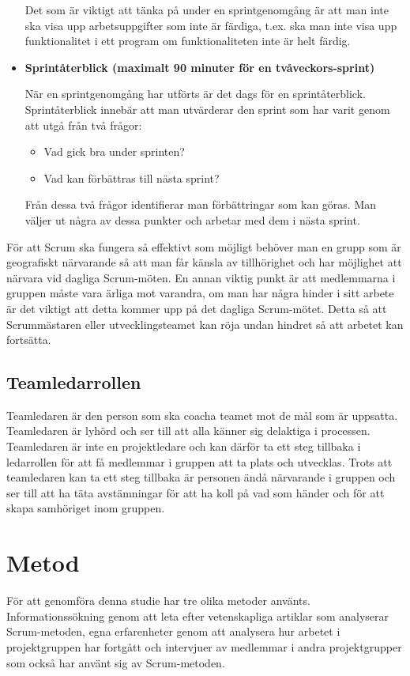 \begin{itemize}
Det som är viktigt att tänka på under en sprintgenomgång är att man inte ska visa upp arbetsuppgifter som inte är färdiga, t.ex. ska man inte visa upp funktionalitet i ett program om funktionaliteten inte är helt färdig.

\item \textbf{Sprintåterblick (maximalt 90 minuter för en tvåveckors-sprint)}

När en sprintgenomgång har utförts är det dags för en sprintåterblick. Sprintåterblick innebär att man utvärderar den sprint som har varit genom att utgå från två frågor:

\begin{itemize}
	\item Vad gick bra under sprinten?
	\item Vad kan förbättras till nästa sprint?
\end{itemize}

Från dessa två frågor identifierar man förbättringar som kan göras. Man väljer ut några av dessa punkter och arbetar med dem i nästa sprint.

\end{itemize}

För att Scrum ska fungera så effektivt som möjligt behöver man en grupp som är geografiskt närvarande så att man får känsla av tillhörighet och har möjlighet att närvara vid dagliga Scrum-möten. En annan viktig punkt är att medlemmarna i gruppen måste vara ärliga mot varandra, om man har några hinder i sitt arbete är det viktigt att detta kommer upp på det dagliga Scrum-mötet. Detta så att Scrummästaren eller utvecklingsteamet kan röja undan hindret så att arbetet kan fortsätta.\cite{scrum}

\subsection{Teamledarrollen}
Teamledaren är den person som ska coacha teamet mot de mål som är uppsatta. Teamledaren är lyhörd och ser till att alla känner sig delaktiga i processen. Teamledaren är inte en projektledare och kan därför ta ett steg tillbaka i ledarrollen för att få medlemmar i gruppen att ta plats och utvecklas.\cite{teamledare} Trots att teamledaren kan ta ett steg tillbaka är personen ändå närvarande i gruppen och ser till att ha täta avstämningar för att ha koll på vad som händer och för att skapa samhöriget inom gruppen.\cite{teamguide}

\section{Metod}
För att genomföra denna studie har tre olika metoder använts. Informationssökning genom att leta efter vetenskapliga artiklar som analyserar Scrum-metoden, egna erfarenheter genom att analysera hur arbetet i projektgruppen har fortgått och intervjuer av medlemmar i andra projektgrupper som också har använt sig av Scrum-metoden.

